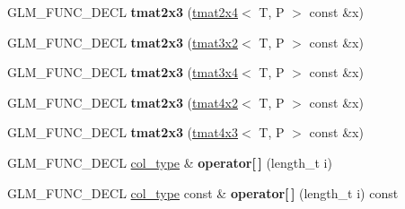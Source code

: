 \begin{DoxyCompactItemize}
\item 
\hypertarget{structglm_1_1detail_1_1tmat2x3_a54b8586adbda881d55b2c98a39ed58c5}{G\-L\-M\-\_\-\-F\-U\-N\-C\-\_\-\-D\-E\-C\-L {\bfseries tmat2x3} (\hyperlink{structglm_1_1detail_1_1tmat2x4}{tmat2x4}$<$ T, P $>$ const \&x)}\label{structglm_1_1detail_1_1tmat2x3_a54b8586adbda881d55b2c98a39ed58c5}

\item 
\hypertarget{structglm_1_1detail_1_1tmat2x3_acdd851e9160ca0515af9eef17a698d36}{G\-L\-M\-\_\-\-F\-U\-N\-C\-\_\-\-D\-E\-C\-L {\bfseries tmat2x3} (\hyperlink{structglm_1_1detail_1_1tmat3x2}{tmat3x2}$<$ T, P $>$ const \&x)}\label{structglm_1_1detail_1_1tmat2x3_acdd851e9160ca0515af9eef17a698d36}

\item 
\hypertarget{structglm_1_1detail_1_1tmat2x3_a715213bd6e4ad7b7c4757590821b7ef2}{G\-L\-M\-\_\-\-F\-U\-N\-C\-\_\-\-D\-E\-C\-L {\bfseries tmat2x3} (\hyperlink{structglm_1_1detail_1_1tmat3x4}{tmat3x4}$<$ T, P $>$ const \&x)}\label{structglm_1_1detail_1_1tmat2x3_a715213bd6e4ad7b7c4757590821b7ef2}

\item 
\hypertarget{structglm_1_1detail_1_1tmat2x3_acc53a40969e8baec1323cbcd3db5021f}{G\-L\-M\-\_\-\-F\-U\-N\-C\-\_\-\-D\-E\-C\-L {\bfseries tmat2x3} (\hyperlink{structglm_1_1detail_1_1tmat4x2}{tmat4x2}$<$ T, P $>$ const \&x)}\label{structglm_1_1detail_1_1tmat2x3_acc53a40969e8baec1323cbcd3db5021f}

\item 
\hypertarget{structglm_1_1detail_1_1tmat2x3_a954965401031a46da66fcbb18536ead0}{G\-L\-M\-\_\-\-F\-U\-N\-C\-\_\-\-D\-E\-C\-L {\bfseries tmat2x3} (\hyperlink{structglm_1_1detail_1_1tmat4x3}{tmat4x3}$<$ T, P $>$ const \&x)}\label{structglm_1_1detail_1_1tmat2x3_a954965401031a46da66fcbb18536ead0}

\item 
\hypertarget{structglm_1_1detail_1_1tmat2x3_a68883354758d90780a8f45ecdef13ef9}{G\-L\-M\-\_\-\-F\-U\-N\-C\-\_\-\-D\-E\-C\-L \hyperlink{structglm_1_1detail_1_1tvec3}{col\-\_\-type} \& {\bfseries operator\mbox{[}$\,$\mbox{]}} (length\-\_\-t i)}\label{structglm_1_1detail_1_1tmat2x3_a68883354758d90780a8f45ecdef13ef9}

\item 
\hypertarget{structglm_1_1detail_1_1tmat2x3_a2eed304fc29634e2129360dbb3856666}{G\-L\-M\-\_\-\-F\-U\-N\-C\-\_\-\-D\-E\-C\-L \hyperlink{structglm_1_1detail_1_1tvec3}{col\-\_\-type} const \& {\bfseries operator\mbox{[}$\,$\mbox{]}} (length\-\_\-t i) const }\label{structglm_1_1detail_1_1tmat2x3_a2eed304fc29634e2129360dbb3856666}


\end{DoxyCompactItemize}
